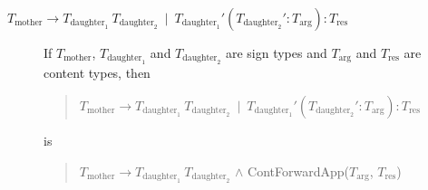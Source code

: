 \begin{description}

      





\item[\textnormal{$T_{\text{mother}}\longrightarrow
    T_{\text{daughter}_1}\ T_{\text{daughter}_2}\ \mid\
    T_{\text{daughter}_1}'(T_{\text{daughter}_2}':T_{\text{arg}}):T_{\text{res}}$}]
  \mbox{}

  If $T_{\text{mother}}$, $T_{\text{daughter}_1}$ and
  $T_{\text{daughter}_2}$ are sign types and $T_{\text{arg}}$ and
  $T_{\text{res}}$ are content types, then
  \begin{quote}
    $T_{\text{mother}}\longrightarrow
    T_{\text{daughter}_1}\ T_{\text{daughter}_2}\ \mid\
    T_{\text{daughter}_1}'(T_{\text{daughter}_2}':T_{\text{arg}}):T_{\text{res}}$
  \end{quote}
  is
  \begin{quote}
  $T_{\text{mother}}\longrightarrow
    T_{\text{daughter}_1}\ T_{\text{daughter}_2}$ \d{\d{$\wedge$}}
    ContForwardApp($T_{\text{arg}}$, $T_{\text{res}}$)
  \end{quote}


\end{description}
